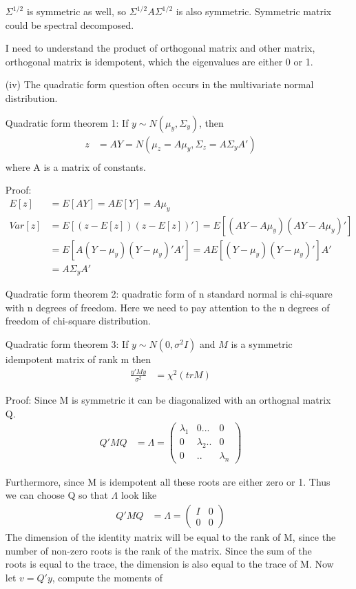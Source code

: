 \begin{itemize}
$\Sigma^{1/2}$ is symmetric as well, so $\Sigma^{1/2} A \Sigma^{1/2} $ is also symmetric. Symmetric matrix could be spectral decomposed.





I need to understand the product of orthogonal matrix and other matrix, orthogonal matrix is idempotent, which the eigenvalues are either 0 or 1.



\item[(iv)] The quadratic form question often occurs in the multivariate normal distribution.

Quadratic form theorem 1:
If $y \sim N(\mu_y, \Sigma_y)$, then 
\begin{align*}
	z &= A Y = N( \mu_z = A \mu_y, \Sigma_z = A \Sigma_y A')\\
\end{align*}	
where A is a matrix of constants.

Proof:
\begin{align*}
	E[z] &= E[A Y ]= AE[Y] = A \mu_y\\
	Var[z] &= E[(z-E[z]) (z-E[z])'] = E[(AY - A \mu_y) (AY - A \mu_y)'] \\
	&= E[A(Y -  \mu_y) (Y -  \mu_y)' A'] = A E[(Y -  \mu_y) (Y -  \mu_y)' ]A' \\
	&= A \Sigma_y A' 
\end{align*}	

Quadratic form theorem 2: quadratic form of n standard normal is chi-square with n degrees of freedom.
Here we need to pay attention to the n degrees of freedom of chi-square distribution.


Quadratic form theorem 3: 
If $y \sim N(0, \sigma^2 I)$ and $M$ is a symmetric idempotent matrix of rank m then
\begin{align*}
	\frac{y' M y}{\sigma^2} &= \chi^2(tr M) 
\end{align*}	

Proof: Since M is symmetric it can be diagonalized with an orthognal matrix Q. 
\begin{align*}
	Q'M Q &= \Lambda = \begin{pmatrix}
		\lambda_1 & 0... & 0 \\
		0 & \lambda_2.. & 0\\
		0&.. &\lambda_n
	\end{pmatrix}
\end{align*}	

Furthermore, since M is idempotent all these roots are either zero or 1. Thus we can choose Q so that $\Lambda$ look like
\begin{align*}
	Q' M Q &= \Lambda = \begin{pmatrix}
		I & 0 \\
		0 & 0
	\end{pmatrix}
\end{align*}	
The dimension of the identity matrix will be equal to the rank of M, since the number of non-zero roots is the rank of the matrix. Since the sum of the roots is equal to the trace, the dimension is also equal to the trace of M. Now let $v= Q'y$, compute the moments of 


\end{itemize}
